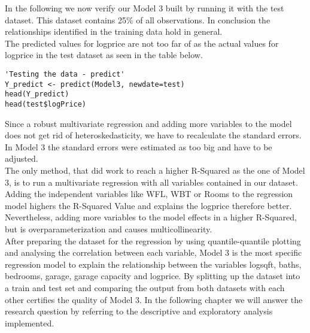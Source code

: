 In the following we now verify our Model 3 built by running it with the test dataset. This dataset contains 25\% of all observations. In conclusion the relationships identified in the training data hold in general. 
\\

The predicted values for logprice are not too far of as the actual values for logprice in the test dataset as seen in the table below. \\

\begin{lstlisting}[frame = single,backgroundcolor=\color{hellgelb}]
'Testing the data - predict'
Y_predict <- predict(Model3, newdate=test)
head(Y_predict)
head(test$logPrice)
\end{lstlisting}

Since a robust multivariate regression and adding more variables to the model does not get rid of heteroskedasticity, we have to recalculate the standard errors. In Model 3 the standard errors were estimated as too big and have to be adjusted. \\
The only method, that did work to reach a higher R-Squared as the one of Model 3, is to run a multivariate regression with all variables contained in our dataset. Adding the independent variables like WFL, WBT or Rooms to the regression model highers the R-Squared Value and explains the logprice therefore better. Nevertheless, adding more variables to the model  effects in a higher R-Squared, but is overparameterization and causes multicollinearity.  \\


After preparing the dataset for the regression by using quantile-quantile plotting and analysing the correlation between each variable, Model 3 is the most specific regression model to explain the relationship between the variables logsqft, baths, bedrooms, garage, garage capacity  and logprice. By splitting up the dataset into a train and test set and comparing the output from both datasets with each other certifies the quality of Model 3. In the following chapter we will answer the research question by referring to the descriptive and exploratory analysis implemented. \\

